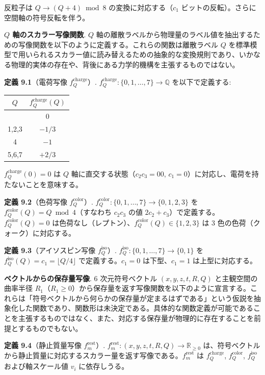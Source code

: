 \documentclass[
  a4paper,11pt]{ltjsarticle}
\newcounter{none}
\theoremstyle{definition}
\theoremstyle{remark}
\begin{document}
反粒子は \(Q \to (Q + 4) \bmod 8\) の変換に対応する（\(c_1\)
ビットの反転）。さらに空間軸の符号反転を伴う。

\textbf{\(Q\) 軸のスカラー写像関数}. \(Q\)
軸の離散ラベルから物理量のラベル値を抽出するための写像関数を以下のように定義する。これらの関数は離散ラベル
\(Q\)
を標準模型で用いられるスカラー値に読み替えるための抽象的な変換規則であり、いかなる物理的実体の存在や、背後にある力学的機構を主張するものではない。

\textbf{定義 9.1}（電荷写像 \(f_Q^{\text{charge}}\)）.
\(f_Q^{\text{charge}}: \{0, 1, \ldots, 7\} \to \mathbb{Q}\)
を以下で定義する:

{\def\LTcaptype{none} %
\begin{longtable}[]{@{}cc@{}}
\toprule\noalign{}
\(Q\) & \(f_Q^{\text{charge}}(Q)\) \\
\midrule\noalign{}
\endhead
\bottomrule\noalign{}
\endlastfoot
0 & \(0\) \\
1,2,3 & \(-1/3\) \\
4 & \(-1\) \\
5,6,7 & \(+2/3\) \\
\end{longtable}
}

\(f_Q^{\text{charge}}(0) = 0\) は \(Q\)
軸に直交する状態（\(c_2 c_3 = 00\),
\(c_1 = 0\)）に対応し、電荷を持たないことを意味する。

\textbf{定義 9.2}（色荷写像 \(f_Q^{\text{color}}\)）.
\(f_Q^{\text{color}}: \{0, 1, \ldots, 7\} \to \{0, 1, 2, 3\}\) を
\(f_Q^{\text{color}}(Q) = Q \bmod 4\)（すなわち \(c_2 c_3\) の値
\(2c_2 + c_3\)）で定義する。\(f_Q^{\text{color}}(Q) = 0\)
は色荷なし（レプトン）、\(f_Q^{\text{color}}(Q) \in \{1, 2, 3\}\) は 3
色の色荷（クォーク）に対応する。

\textbf{定義 9.3}（アイソスピン写像 \(f_Q^{\text{iso}}\)）.
\(f_Q^{\text{iso}}: \{0, 1, \ldots, 7\} \to \{0, 1\}\) を
\(f_Q^{\text{iso}}(Q) = c_1 = \lfloor Q / 4 \rfloor\)
で定義する。\(c_1 = 0\) は下型、\(c_1 = 1\) は上型に対応する。

\textbf{ベクトルからの保存量写像}. 6 次元符号ベクトル
\((x, y, z, t, R, Q)\) と主観空間の曲率半径
\(R_1\)（\(R_1 \geq 0\)）から保存量を返す写像関数を以下のように宣言する。これらは「符号ベクトルから何らかの保存量が定まるはずである」という仮説を抽象化した関数であり、関数形は未決定である。具体的な関数定義が可能であることを主張するものではなく、また、対応する保存量が物理的に存在することを前提とするものでもない。

\textbf{定義 9.4}（静止質量写像 \(f_m^{\text{rest}}\)）.
\(f_m^{\text{rest}}: (x, y, z, t, R, Q) \to \mathbb{R}_{\geq 0}\)
は、符号ベクトルから静止質量に対応するスカラー量を返す写像である。\(f_m^{\text{rest}}\)
は \(f_Q^{\text{charge}}\), \(f_Q^{\text{color}}\), \(f_Q^{\text{iso}}\)
および軸スケール値 \(v_i\) に依存しうる。
\end{document}
